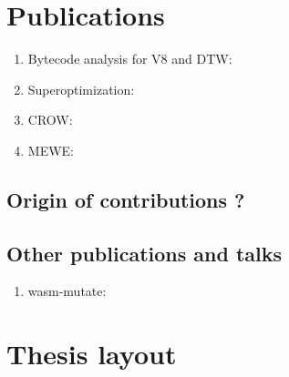 \section{Publications}

\begin{enumerate}[label=(\subscript{P}{{\arabic*}})]
    \item Bytecode analysis for V8 and DTW: \todo{}
    \item Superoptimization: \todo{}
    \item CROW: \todo{}
    \item MEWE: \todo{}
\end{enumerate}

\subsection*{Origin of contributions ?}

\subsection*{Other publications and talks}

\begin{enumerate}
    \item wasm-mutate: \todo{}
\end{enumerate}

\section*{Thesis layout}